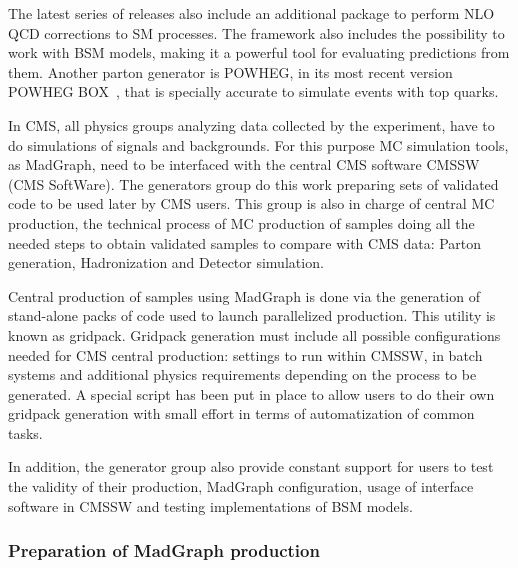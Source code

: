 The latest series of releases also include an additional package to perform NLO QCD corrections to SM processes. The framework also includes the possibility to work with BSM models, making it a powerful tool for evaluating predictions from them. Another parton generator is POWHEG, in its most recent version POWHEG BOX~\cite{Nason:2004rx, Frixione:2007vw, Alioli:2010xd}, that is specially accurate to simulate events with top quarks. %

In CMS, all physics groups analyzing data collected by the experiment, have to do simulations of signals and backgrounds. For this purpose MC simulation tools, as MadGraph, need to be interfaced with the central CMS software CMSSW (CMS SoftWare). The generators group do this work preparing sets of validated code to be used later by CMS users. This group is also in charge of central MC production, the technical process of MC production of samples doing all the needed steps to obtain validated samples to compare with CMS data: Parton generation, Hadronization and Detector simulation. 

Central production of samples using MadGraph is done via the generation of stand-alone packs of code used to launch parallelized production. This utility is known as gridpack. Gridpack generation must include all possible configurations needed for CMS central production: settings to run within CMSSW, in batch systems and additional physics requirements depending on the process to be generated. A special script has been put in place to allow users to do their own gridpack generation with small effort in terms of automatization of common tasks.

In addition, the generator group also provide constant support for users to test the validity of their production, MadGraph configuration, usage of interface software in CMSSW and testing implementations of BSM models.

\subsubsection{Preparation of MadGraph production}

